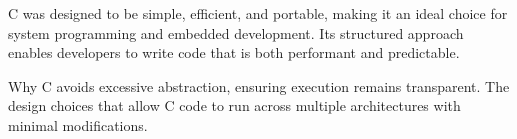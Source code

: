 \begin{NxSSBox}
	\begin{NxIDBox}
		C was designed to be simple, efficient, and portable, making it an ideal choice for system programming and embedded development. Its structured approach enables developers to write code that is both performant and predictable.
	\end{NxIDBox}
	\begin{NxIDBoxL}
		 Why C avoids excessive abstraction, ensuring execution remains transparent.
		 The design choices that allow C code to run across multiple architectures with minimal modifications.
	\end{NxIDBoxL}
\end{NxSSBox}





